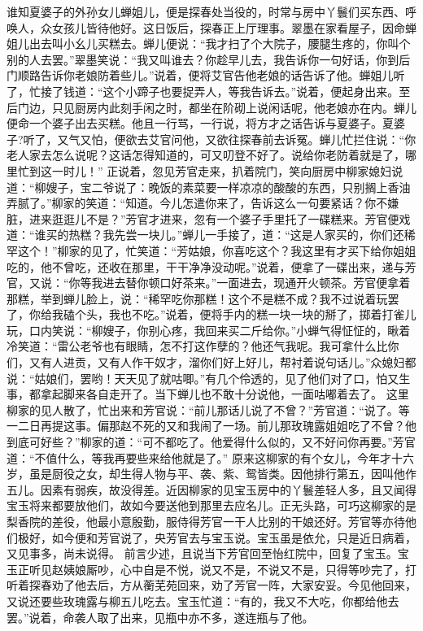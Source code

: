 \documentclass[12pt,oneside]{book}
\begin{document}
谁知夏婆子的外孙女儿蝉姐儿，便是探春处当役的，时常与房中丫鬟们买东西、呼唤人，众女孩儿皆待他好。这日饭后，探春正上厅理事。翠墨在家看屋子，因命蝉姐儿出去叫小幺儿买糕去。蝉儿便说：“我才扫了个大院子，腰腿生疼的，你叫个别的人去罢。”翠墨笑说：“我又叫谁去？你趁早儿去，我告诉你一句好话，你到后门顺路告诉你老娘防着些儿。”说着，便将艾官告他老娘的话告诉了他。蝉姐儿听了，忙接了钱道：“这个小蹄子也要捉弄人，等我告诉去。”说着，便起身出来。至后门边，只见厨房内此刻手闲之时，都坐在阶砌上说闲话呢，他老娘亦在内。蝉儿便命一个婆子出去买糕。他且一行骂，一行说，将方才之话告诉与夏婆子。夏婆子?听了，又气又怕，便欲去艾官问他，又欲往探春前去诉冤。蝉儿忙拦住说：“你老人家去怎么说呢？这话怎得知道的，可又叨登不好了。说给你老防着就是了，哪里忙到这一时儿！”
正说着，忽见芳官走来，扒着院门，笑向厨房中柳家媳妇说道：“柳嫂子，宝二爷说了：晚饭的素菜要一样凉凉的酸酸的东西，只别搁上香油弄腻了。”柳家的笑道：“知道。今儿怎遣你来了，告诉这么一句要紧话？你不嫌脏，进来逛逛儿不是？”芳官才进来，忽有一个婆子手里托了一碟糕来。芳官便戏道：“谁买的热糕？我先尝一块儿。”蝉儿一手接了，道：“这是人家买的，你们还稀罕这个！”柳家的见了，忙笑道：“芳姑娘，你喜吃这个？我这里有才买下给你姐姐吃的，他不曾吃，还收在那里，干干净净没动呢。”说着，便拿了一碟出来，递与芳官，又说：“你等我进去替你顿口好茶来。”一面进去，现通开火顿茶。芳官便拿着那糕，举到蝉儿脸上，说：“稀罕吃你那糕！这个不是糕不成？我不过说着玩罢了，你给我磕个头，我也不吃。”说着，便将手内的糕一块一块的掰了，掷着打雀儿玩，口内笑说：“柳嫂子，你别心疼，我回来买二斤给你。”小蝉气得怔怔的，瞅着冷笑道：“雷公老爷也有眼睛，怎不打这作孽的？他还气我呢。我可拿什么比你们，又有人进贡，又有人作干奴才，溜你们好上好儿，帮衬着说句话儿。”众媳妇都说：“姑娘们，罢哟！天天见了就咕唧。”有几个伶透的，见了他们对了口，怕又生事，都拿起脚来各自走开了。当下蝉儿也不敢十分说他，一面咕嘟着去了。
这里柳家的见人散了，忙出来和芳官说：“前儿那话儿说了不曾？”芳官道：“说了。等一二日再提这事。偏那赵不死的又和我闹了一场。前儿那玫瑰露姐姐吃了不曾？他到底可好些？”柳家的道：“可不都吃了。他爱得什么似的，又不好问你再要。”芳官道：“不值什么，等我再要些来给他就是了。”
原来这柳家的有个女儿，今年才十六岁，虽是厨役之女，却生得人物与平、袭、紫、鸳皆类。因他排行第五，因叫他作五儿。因素有弱疾，故没得差。近因柳家的见宝玉房中的丫鬟差轻人多，且又闻得宝玉将来都要放他们，故如今要送他到那里去应名儿。正无头路，可巧这柳家的是梨香院的差役，他最小意殷勤，服侍得芳官一干人比别的干娘还好。芳官等亦待他们极好，如今便和芳官说了，央芳官去与宝玉说。宝玉虽是依允，只是近日病着，又见事多，尚未说得。
前言少述，且说当下芳官回至怡红院中，回复了宝玉。宝玉正听见赵姨娘厮吵，心中自是不悦，说又不是，不说又不是，只得等吵完了，打听着探春劝了他去后，方从蘅芜苑回来，劝了芳官一阵，大家安妥。今见他回来，又说还要些玫瑰露与柳五儿吃去。宝玉忙道：“有的，我又不大吃，你都给他去罢。”说着，命袭人取了出来，见瓶中亦不多，遂连瓶与了他。
\end{document}
